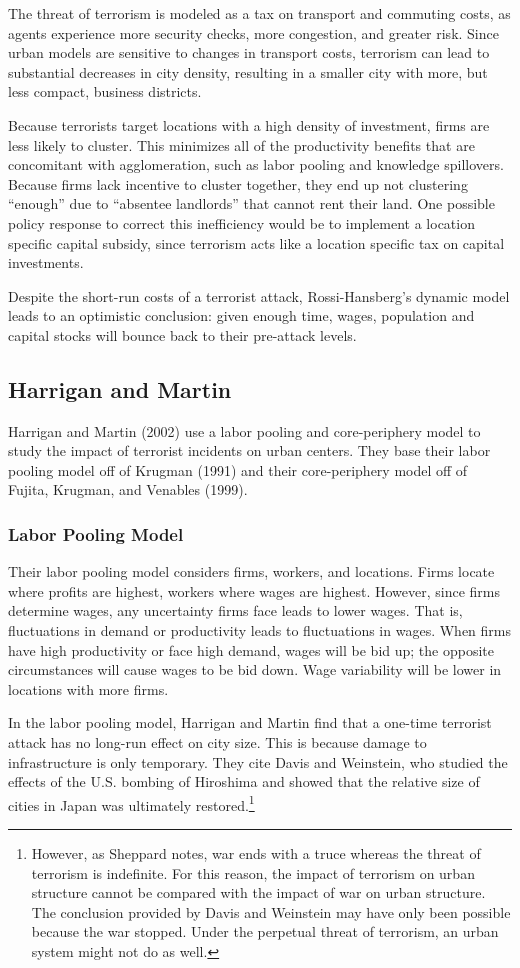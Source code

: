 \documentclass[preprint,2p,12pt]{elsarticle}
\begin{document}
The threat of terrorism is modeled as a tax on transport and commuting costs, as agents experience more security checks, more congestion, and greater risk.
Since urban models are sensitive to changes in transport costs, terrorism can lead to substantial decreases in city density, resulting in a smaller city with more, but less compact, business districts. 

Because terrorists target locations with a high density of investment, firms are less likely to cluster.
This minimizes all of the productivity benefits that are concomitant with agglomeration, such as labor pooling and knowledge spillovers.
Because firms lack incentive to cluster together, they end up not clustering ``enough'' due to ``absentee landlords'' that cannot rent their land. 
One possible policy response to correct this inefficiency would be to implement a location specific capital subsidy, since terrorism acts like a location specific tax on capital investments.

Despite the short-run costs of a terrorist attack, Rossi-Hansberg's dynamic model leads to an optimistic conclusion: given enough time, wages, population and capital stocks will bounce back to their pre-attack levels.


\subsection{\sc Harrigan and Martin}
Harrigan and Martin (2002) use a labor pooling and core-periphery model to study the impact of terrorist incidents on urban centers.
They base their labor pooling model off of Krugman (1991) and their core-periphery model off of Fujita, Krugman, and Venables (1999).

\subsubsection{Labor Pooling Model}
Their labor pooling model considers firms, workers, and locations.
Firms locate where profits are highest, workers where wages are highest.
However, since firms determine wages, any uncertainty firms face leads to lower wages.
That is, fluctuations in demand or productivity leads to fluctuations in wages.
When firms have high productivity or face high demand, wages will be bid up; the opposite circumstances will cause wages to be bid down.
Wage variability will be lower in locations with more firms. 

In the labor pooling model, Harrigan and Martin find that a one-time terrorist attack has no long-run effect on city size.
This is because damage to infrastructure is only temporary.
They cite Davis and Weinstein, who studied the effects of the U.S. bombing of Hiroshima and showed that the relative size of cities in Japan was ultimately restored.\footnote{However, as Sheppard notes, war ends with a truce whereas the threat of terrorism is indefinite. For this reason, the impact of terrorism on urban structure cannot be compared with the impact of war on urban structure. The conclusion provided by Davis and Weinstein may have only been possible because the war stopped. Under the perpetual threat of terrorism, an urban system might not do as well.}
\end{document}
